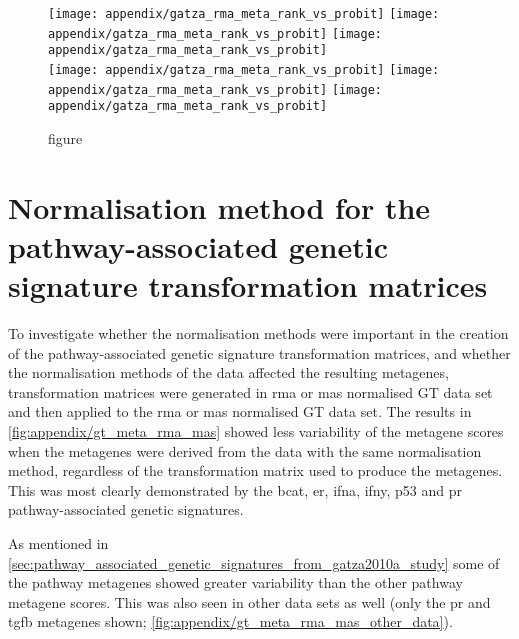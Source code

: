 	\begin{figure}[htpb]
		\ContinuedFloat
		\captionsetup{list=off,format=cont}
		\centering
		\texttt{[image: appendix/gatza\_rma\_meta\_rank\_vs\_probit]}
		\texttt{[image: appendix/gatza\_rma\_meta\_rank\_vs\_probit]}
		\texttt{[image: appendix/gatza\_rma\_meta\_rank\_vs\_probit]}\\
		\texttt{[image: appendix/gatza\_rma\_meta\_rank\_vs\_probit]}
		\texttt{[image: appendix/gatza\_rma\_meta\_rank\_vs\_probit]}
		\texttt{[image: appendix/gatza\_rma\_meta\_rank\_vs\_probit]}\\
		\vspace{1em}
		\caption[]{figure}
	\end{figure}

	\section{Normalisation method for the pathway-associated genetic signature transformation matrices}
	\label{sec:normalisation_method_for_pathway_associated_genetic_signature_transformation_matrices}

	To investigate whether the normalisation methods were important in the creation of the pathway-associated genetic signature transformation matrices, and whether the normalisation methods of the data affected the resulting metagenes, transformation matrices were generated in \gls{rma} or \gls{mas} normalised GT data set and then applied to the \gls{rma} or \gls{mas} normalised GT data set.
	The results in \cref{fig:appendix/gt_meta_rma_mas} showed less variability of the metagene scores when the metagenes were derived from the data with the same normalisation method, regardless of the transformation matrix used to produce the metagenes.
	This was most clearly demonstrated by the \gls{bcat}, \gls{er}, \gls{ifna}, \gls{ifny}, p53 and \gls{pr} pathway-associated genetic signatures.

	As mentioned in \cref{sec:pathway_associated_genetic_signatures_from_gatza2010a_study} some of the pathway metagenes showed greater variability than the other pathway metagene scores.
	This was also seen in other data sets as well (only the \gls{pr} and \gls{tgfb} metagenes shown; \cref{fig:appendix/gt_meta_rma_mas_other_data}).

